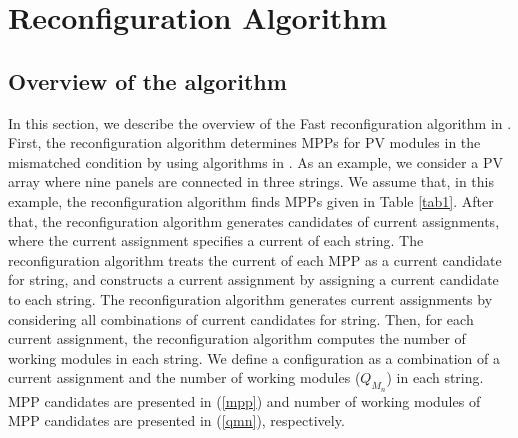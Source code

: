 \documentclass[conference]{IEEEtran}
\begin{document}
\section{Reconfiguration Algorithm} \label{algo}

\subsection{Overview of the algorithm}
In this section, we describe the overview of the Fast reconfiguration algorithm in \cite{b10}. First, the reconfiguration algorithm determines MPPs for PV modules in the mismatched condition by using algorithms in \cite{b6}\cite{b7}. As an example, we consider a PV array where nine panels are connected in three strings. We assume that, in this example, the reconfiguration algorithm finds MPPs given in Table \ref{tab1}.
After that, the reconfiguration algorithm generates candidates of current assignments, where the current assignment specifies a current of each string. The reconfiguration algorithm treats the current of each MPP as a current candidate for string, and constructs a current assignment by assigning a current candidate to each string. The reconfiguration algorithm generates current assignments by considering all combinations of current candidates for string.
Then, for each current assignment, the reconfiguration algorithm computes the number of working modules in each string. We define a configuration as a combination of a current assignment and the number of working modules (\textit{$Q_{M_n}$}) in each string. MPP candidates are presented in (\ref{mpp}) and number of working modules of MPP candidates are presented in (\ref{qmn}), respectively. 
\end{document}
